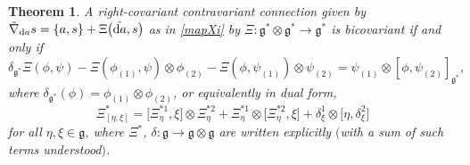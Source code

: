 \documentclass[10pt,a4paper]{amsart}
\numberwithin{equation}{section}
\newtheorem{Theorem}{Theorem}[section]
\newcommand{\<}{{\langle}}
\renewcommand{\>}{{\rangle}}
\newcommand{\tens}{\otimes}
\newcommand{\extd}{{\rm d}}
\newcommand{\cg}{{\mathfrak{g}}}
\begin{document}
\begin{Theorem}\label{bicovXi} A right-covariant contravariant connection given by $\tilde\nabla_{\extd a}s=\{a,s\}+\Xi\big(\tilde{\extd a},s\big)$ as in \eqref{mapXi} by $\Xi\colon \cg^*\tens \cg^*\to \cg^*$ is bicovariant if and only if
\begin{equation*}%
\delta_{\mathfrak{g}^*}\Xi(\phi,\psi)-\Xi(\phi_{(1)},\psi)\tens\phi_{(2)}-\Xi(\phi,\psi_{(1)})\tens\psi_{(2)}=\psi_{(1)}\tens [\phi,\psi_{(2)}]_{\cg^*}, \end{equation*}
where $\delta_{\mathfrak{g}^*}(\phi)=\phi_{(1)}\tens\phi_{(2)}$, or equivalently in dual form,
\begin{equation*}%
 \Xi^*_{[\eta,\xi]}= \big[\Xi^{*1}_\eta,\xi\big]\tens\Xi_\eta^{*2}+ \Xi^{*1}_\eta \tens\big[ \Xi_\eta^{*2},\xi\big] +\delta^1_\xi\tens \big[\eta,\delta^2_\xi\big]
\end{equation*}
for all $\eta,\xi\in \cg$, where $\Xi^*$, $\delta\colon \cg\to \cg\tens\cg$ are written explicitly $($with a sum of such terms understood$)$.
\end{Theorem}
\end{document}
